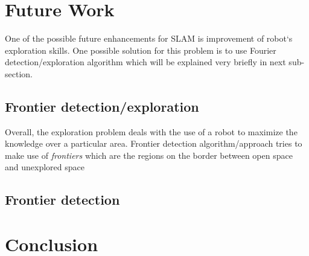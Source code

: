 \documentclass{ba-kecs}
\numberwithin{figure}{section}
\begin{document}

\section{Future Work}

	One of the possible future enhancements for SLAM is improvement of robot`s exploration skills. One possible solution for this problem is to use Fourier detection/exploration algorithm which will be explained very briefly in next sub-section.
\subsection{Frontier detection/exploration}
	Overall, the exploration problem deals with the use of a robot to maximize the knowledge over a particular area. Frontier detection algorithm/approach tries to make use of \textit{frontiers} which are the regions on the border between open space and unexplored space \cite{frontier}

\subsection{Frontier detection}


\section{Conclusion}



\end{document}
